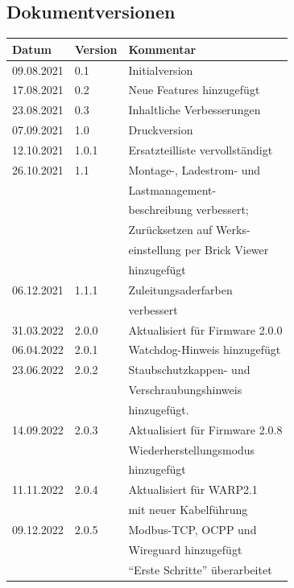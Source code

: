 \documentclass[a4paper,10pt]{article}
\begin{document}
\begin{multicols*}{2}
	\section{Dokumentversionen}
	\begin{tabular}{lll}
		\toprule
		Datum      & Version & Kommentar                       \\
		\midrule
		09.08.2021 & 0.1     & Initialversion                  \\
		17.08.2021 & 0.2     & Neue Features hinzugefügt       \\
		23.08.2021 & 0.3     & Inhaltliche Verbesserungen      \\
		07.09.2021 & 1.0     & Druckversion                    \\
		12.10.2021 & 1.0.1   & Ersatzteilliste vervollständigt \\
		26.10.2021 & 1.1     & Montage-, Ladestrom- und        \\
		           &         & Lastmanagement-                 \\
		           &         & beschreibung verbessert;        \\
		           &         & Zurücksetzen auf Werks-         \\
		           &         & einstellung per Brick Viewer    \\
		           &         & hinzugefügt                     \\
		06.12.2021 & 1.1.1   & Zuleitungsaderfarben            \\
		           &         & verbessert                      \\
		31.03.2022 & 2.0.0   & Aktualisiert für Firmware 2.0.0 \\
		06.04.2022 & 2.0.1   & Watchdog-Hinweis hinzugefügt    \\
		23.06.2022 & 2.0.2   & Staubschutzkappen- und          \\
		           &         & Verschraubungshinweis           \\
		           &         & hinzugefügt.                    \\
		14.09.2022 & 2.0.3   & Aktualisiert für Firmware 2.0.8 \\
		           &         & Wiederherstellungsmodus         \\
		           &         & hinzugefügt                     \\
		11.11.2022 & 2.0.4   & Aktualisiert für WARP2.1        \\
		           &         & mit neuer Kabelführung          \\
		09.12.2022 & 2.0.5   & Modbus-TCP, OCPP und            \\
		           &         & Wireguard hinzugefügt           \\
		           &         & \enquote{Erste Schritte} überarbeitet \\
		\bottomrule
	\end{tabular}


\end{multicols*}
\end{document}
